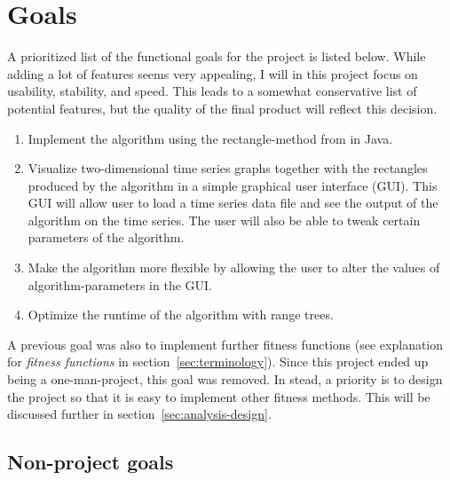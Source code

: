
\section{Goals} \label{sec:goals}

A prioritized list of the functional goals for the project is listed below.
While adding a lot of features seems very appealing, I will in this project
focus on usability, stability, and speed. This leads to a somewhat conservative
list of potential features, but the quality of the final product will reflect
this decision. 

\begin{enumerate}
    \item Implement the algorithm using the rectangle-method from
    \cite{doerr2017a} in Java. 
    
    \item Visualize two-dimensional time series graphs together with the
    rectangles produced by the algorithm in a simple graphical user interface
    (GUI). This GUI will allow user to load a time series data file and see the
    output of the algorithm on the time series. The user will also be able to
    tweak certain parameters of the algorithm. 

    \item Make the algorithm more flexible by allowing the user to alter the
    values of algorithm-parameters in the GUI. 
    
    \item Optimize the runtime of the algorithm with range trees. 
\end{enumerate}

A previous goal was also to implement further fitness functions (see explanation
for \textit{fitness functions} in section~\ref{sec:terminology}). Since this
project ended up being a one-man-project, this goal was removed. In stead, a
priority is to design the project so that it is easy to implement other fitness
methods. This will be discussed further in section~\ref{sec:analysis-design}.


\subsection{Non-project goals} 

